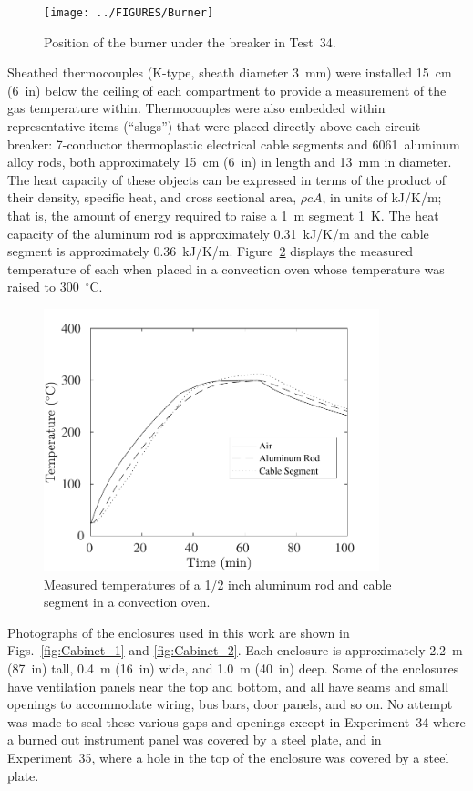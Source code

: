 \documentclass[12pt]{article}
\begin{document}
\begin{figure}[ht]
\centering
\texttt{[image: ../FIGURES/Burner]}
\caption[Position of the burner] {Position of the burner under the breaker in Test~34.}
\label{fig:Burner}
\end{figure}

Sheathed thermocouples (K-type, sheath diameter 3~mm) were installed 15~cm (6~in) below the ceiling of each compartment to provide a measurement of the gas temperature within. Thermocouples were also embedded within representative items (``slugs'') that were placed directly above each circuit breaker: 7-conductor thermoplastic electrical cable segments and 6061~aluminum alloy rods, both approximately  15~cm (6~in) in length and 13~mm in diameter. The heat capacity of these objects can be expressed in terms of the product of their density, specific heat, and cross sectional area, $\rho c A$, in units of kJ/K/m; that is, the amount of energy required to raise a 1~m segment 1~K. The heat capacity of the aluminum rod is approximately 0.31~kJ/K/m and the cable segment is approximately 0.36~kJ/K/m. Figure~\ref{oven} displays the measured temperature of each when placed in a convection oven whose temperature was raised to 300~$^\circ$C.

\begin{figure}[!ht]
\centering
\includegraphics[height=3.0in]{../SCRIPT_FIGURES/Oven_Test}
\caption[Measured temperatures of slug calorimeters in a convection oven]{Measured temperatures of a 1/2 inch aluminum rod and cable segment in a convection oven.}
\label{oven}
\end{figure}

Photographs of the enclosures used in this work are shown in Figs.~\ref{fig:Cabinet_1} and \ref{fig:Cabinet_2}. Each enclosure is approximately 2.2~m (87~in) tall, 0.4~m (16~in) wide, and 1.0~m (40~in) deep. Some of the enclosures have ventilation panels near the top and bottom, and all have seams and small openings to accommodate wiring, bus bars, door panels, and so on. No attempt was made to seal these various gaps and openings except in Experiment~34 where a burned out instrument panel was covered by a steel plate, and in Experiment~35, where a hole in the top of the enclosure was covered by a steel plate.
\end{document}
